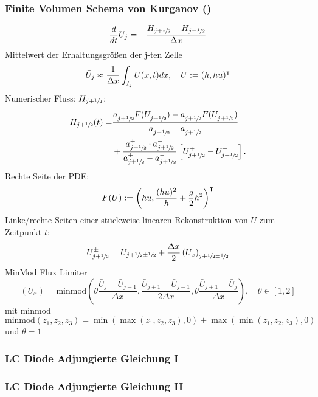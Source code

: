 \begin{frame}
\frametitle{Finite Volumen Schema von Kurganov (\cite{kurganov2007second})}
 \[
 \frac{d}{dt} \bar U_j = - \frac{H_{j+\sfrac{1}{2}}-H_{j-\sfrac{1}{2}}}{\Delta x}
\]
Mittelwert der Erhaltungsgrößen der j-ten Zelle 
\[
 \bar U_j \approx \frac{1}{\Delta x}\int_{I_j} U(x,t) dx, \quad U:=(h,hu)^\intercal
\]
Numerischer Fluss: $H_{j+\sfrac{1}{2}}$:
\[
\begin{aligned}
 H_{j+\sfrac{1}{2}}(t) =& \frac{a^+_{j+\sfrac{1}{2}}F(U^-_{j+\sfrac{1}{2}}) - a^-_{j+\sfrac{1}{2}}F(U^+_{j+\sfrac{1}{2}})}{a^+_{j+\sfrac{1}{2}} -a^-_{j+\sfrac{1}{2}}} \\
 & +\frac{a^+_{j+\sfrac{1}{2}} \cdot a^-_{j+\sfrac{1}{2}}}{a^+_{j+\sfrac{1}{2}} -a^-_{j+\sfrac{1}{2}}}\left[U^+_{j+\sfrac{1}{2}} - U^-_{j+\sfrac{1}{2}}\right].
\end{aligned}
 \]
Rechte Seite der PDE:
\[
 F(U) := \left( hu, \frac{(hu)^2}{h}  +\frac{g}{2} h^2 \right)^\intercal
\]
Linke/rechte Seiten einer stückweise linearen Rekonstruktion von $U$ zum Zeitpunkt $t$:
\[
 U^\pm_{j+\sfrac{1}{2}} = U_{j+\sfrac{1}{2} \pm \sfrac{1}{2}} + \frac{\Delta x}{2} \left(U_x\right)_{j+\sfrac{1}{2}\pm\sfrac{1}{2}}
\]
MinMod Flux Limiter
\[
 \left(U_x\right) = \text{minmod}\left(\theta \frac{\bar U_j- \bar U_{j-1}}{\Delta x},\frac{\bar U_{j+1}- \bar U_{j-1}}{2\Delta x},\theta\frac{ \bar U_{j+1}- \bar U_{j}}{\Delta x}  \right), \quad \theta \in [1,2]
\]
mit minmod
 \[
\text{minmod}(z_1,z_2,z_3) = \min(\max(z_1,z_2,z_3),0) + \max(\min(z_1,z_2,z_3),0)    
 \]
und $\theta = 1$
\end{frame}



\begin{frame}
\frametitle{LC Diode Adjungierte Gleichung I}
\begin{minipage}[c]{0.45\textwidth}
\centering
\scalebox{0.9}{}
\scalebox{0.9}{}
\end{minipage}
\begin{minipage}[c]{0.45\textwidth}
\centering
\scalebox{0.9}{}
\scalebox{0.9}{}
\end{minipage}
\end{frame}

\begin{frame}
\frametitle{LC Diode Adjungierte Gleichung II}
\begin{minipage}[c]{0.45\textwidth}
\centering
\scalebox{0.9}{}
\scalebox{0.9}{}
\end{minipage}
\begin{minipage}[c]{0.45\textwidth}
\centering
\scalebox{0.9}{}
\scalebox{0.9}{}
\end{minipage}
\end{frame}


